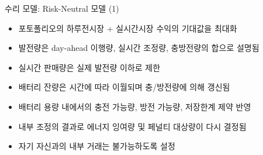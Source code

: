 \documentclass[xcolor=dvipsnames,t,9pt]{beamer}
\begin{document}
\begin{frame}{수리 모델: Risk-Neutral 모델 (1)}
    \small
    \begin{itemize}
        \item[(1a)] 포토폴리오의 하루전시장 + 실시간시장 수익의 기대값을 최대화
        \item[(1b)] 발전량은 day-ahead 이행량, 실시간 조정량, 충방전량의 합으로 설명됨
        \item[(1c)] 실시간 판매량은 실제 발전량 이하로 제한
        \item[(1d)] 배터리 잔량은 시간에 따라 이월되며 충/방전량에 의해 갱신됨
        \item[(1e)] 배터리 용량 내에서의 충전 가능량, 방전 가능량, 저장한계 제약 반영
        \item[(1f)] 내부 조정의 결과로 에너지 잉여량 및 페널티 대상량이 다시 결정됨
        \item[(1g)] 자기 자신과의 내부 거래는 불가능하도록 설정
    \end{itemize}
\end{frame}
\end{document}
